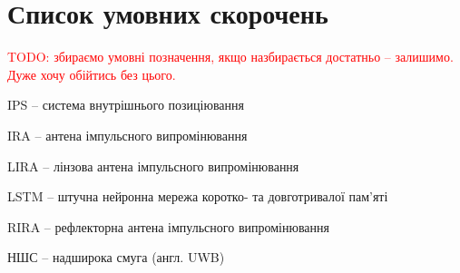 \chapter*{Список умовних скорочень}


\textcolor{red}{TODO: збираємо умовні позначення, якщо назбирається 
достатньо -- залишимо. Дуже хочу обійтись без цього.}

IPS -- система внутрішнього позиціювання

IRA -- антена імпульсного випромінювання

LIRA -- лінзова антена імпульсного випромінювання

LSTM -- штучна нейронна мережа коротко- та довготривалої пам'яті

RIRA -- рефлекторна антена імпульсного випромінювання

НШС -- надширока смуга (англ. UWB)
